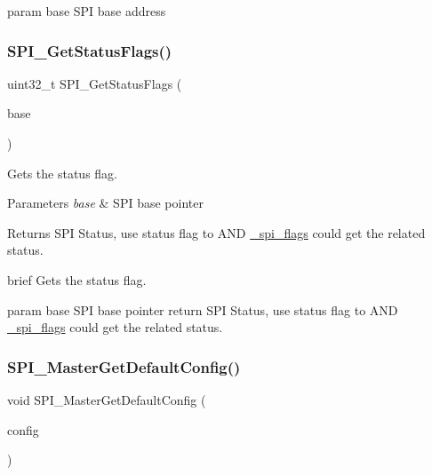 param base S\+PI base address \mbox{\label{group__spi__driver_gaaa5a317a68b409dfe20397b45e48d1f0}} 
\subsubsection{\texorpdfstring{SPI\_GetStatusFlags()}{SPI\_GetStatusFlags()}}
{\footnotesize\ttfamily uint32\+\_\+t S\+P\+I\+\_\+\+Get\+Status\+Flags (\begin{DoxyParamCaption}\item[{\mbox{\hyperlink{struct_s_p_i___type}{S\+P\+I\+\_\+\+Type}} $\ast$}]{base }\end{DoxyParamCaption})}



Gets the status flag. 


\begin{DoxyParams}{Parameters}
{\em base} & S\+PI base pointer \\
\hline
\end{DoxyParams}
\begin{DoxyReturn}{Returns}
S\+PI Status, use status flag to A\+ND \mbox{\hyperlink{group__spi__driver_gaea776f478792865a85b7311e6ff5896c}{\+\_\+spi\+\_\+flags}} could get the related status.
\end{DoxyReturn}
brief Gets the status flag.

param base S\+PI base pointer return S\+PI Status, use status flag to A\+ND \mbox{\hyperlink{group__spi__driver_gaea776f478792865a85b7311e6ff5896c}{\+\_\+spi\+\_\+flags}} could get the related status. \mbox{\label{group__spi__driver_ga45c08fc078ae334b79fb844379140838}} 
\subsubsection{\texorpdfstring{SPI\_MasterGetDefaultConfig()}{SPI\_MasterGetDefaultConfig()}}
{\footnotesize\ttfamily void S\+P\+I\+\_\+\+Master\+Get\+Default\+Config (\begin{DoxyParamCaption}\item[{\mbox{\hyperlink{group__spi__driver_ga15e5f834f83ba89de1e920bba9d00394}{spi\+\_\+master\+\_\+config\+\_\+t}} $\ast$}]{config }\end{DoxyParamCaption})}



